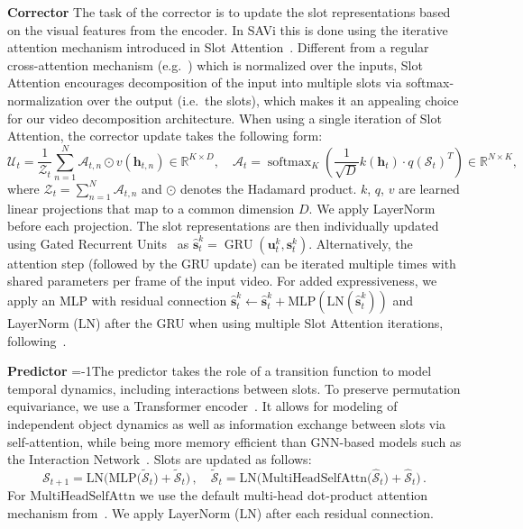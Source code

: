 \documentclass{article}
\newcommand{\modelname}{SAVi\xspace}
\DeclareMathOperator*{\softmax}{softmax}
\DeclareMathOperator{\GRU}{GRU}
\begin{document}
\textbf{Corrector}\quad
The task of the corrector is to update the slot representations based on the visual features from the encoder. 
In \modelname this is done using the iterative attention mechanism introduced in Slot Attention~\citep{locatello2020object}. Different from a regular cross-attention mechanism (e.g.~\citealp{vaswani2017attention}) which is normalized over the inputs, Slot Attention encourages decomposition of the input into multiple slots via softmax-normalization over the output (i.e.~the slots), which makes it an appealing choice for our video decomposition architecture. When using a single iteration of Slot Attention, the corrector update takes the following form:
\begin{equation}
  \mathcal{U}_t = \frac{1}{\mathcal{Z}_t}\sum_{n=1}^{N} \mathcal{A}_{t,n} \odot v(\bm{h}_{t,n}) \in \mathbb{R}^{K\times D}, \quad \mathcal{A}_t = \softmax_K \left( \frac{1}{\sqrt{D}} k(\bm{h}_t) \cdot q(\mathcal{S}_{t})^T \right) \in \mathbb{R}^{N\times K},  
\end{equation}
where $\mathcal{Z}_t = \sum_{n=1}^{N} \mathcal{A}_{t,n}$ and $\odot$ denotes the Hadamard product. $k$, $q$, $v$ are learned linear projections that map to a common dimension $D$. We apply LayerNorm \citep{ba2016layer} before each projection.
The slot representations are then individually updated using Gated Recurrent Units~\citep{cho2014learning} as $\bm{\hat{s}}^k_t = \GRU(\bm{u}^k_t, \bm{s}^k_{t})$. Alternatively, the attention step (followed by the GRU update) can be iterated multiple times with shared parameters per frame of the input video. For added expressiveness, we apply an MLP with residual connection $\bm{\hat{s}}^k_t \leftarrow \bm{\hat{s}}^k_t + \mathrm{MLP}(\mathrm{LN}(\bm{\hat{s}}^k_t))$ and LayerNorm ($\mathrm{LN}$) after the GRU when using multiple Slot Attention iterations, following~\citet{locatello2020object}.
 

\textbf{Predictor}\quad
\looseness=-1The predictor takes the role of a transition function to model temporal dynamics, including interactions between slots. 
To preserve permutation equivariance, we use a Transformer encoder~\citep{vaswani2017attention}.
It allows for modeling of independent object dynamics as well as information exchange between slots via self-attention, while being more memory efficient than GNN-based models such as the Interaction Network~\citep{battaglia2016interaction}. Slots are updated as follows:
\begin{equation}
  \mathcal{S}_{t+1} = \mathrm{LN}\bigl( \mathrm{MLP}\bigl(\mathcal{\tilde{S}}_{t}\bigr) + \mathcal{\tilde{S}}_{t})\,,\quad \mathcal{\tilde{S}}_{t} = \mathrm{LN}\bigl( \mathrm{MultiHeadSelfAttn}\bigl(\mathcal{\hat{S}}_t\bigr) + \mathcal{\hat{S}}_t\bigr)\,.
\end{equation}
For $\mathrm{MultiHeadSelfAttn}$ we use the default multi-head dot-product attention mechanism from~\citet{vaswani2017attention}. We apply LayerNorm ($\mathrm{LN}$) after each residual connection.
\end{document}
